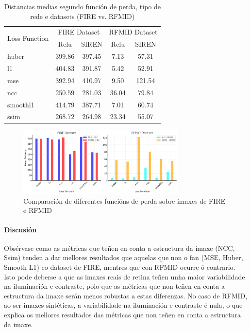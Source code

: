\begin{table}[h]
    \centering
    \begin{tabular}{|l|cc|cc|}
    \hline
    \multirow{2}{*}{Loss Function} & \multicolumn{2}{c|}{FIRE Dataset} & \multicolumn{2}{c|}{RFMID Dataset} \\ \cline{2-5}
     & Relu & SIREN & Relu & SIREN \\ \hline
    huber & 399.86 & 397.45 & 7.13 & 57.31 \\ \hline
    l1 & 404.83 & 391.87 & 5.42 & 52.91 \\ \hline
    mse & 392.94 & 410.97 & 9.50 & 121.54 \\ \hline
    ncc & 250.59 & 281.03 & 36.04 & 79.84 \\ \hline
    smoothl1 & 414.79 & 387.71 & 7.01 & 60.74 \\ \hline
    ssim & 268.72 & 264.98 & 23.34 & 55.07 \\ \hline
    \end{tabular}
    \caption{Distancias medias segundo función de perda, tipo de rede e datasets (FIRE vs. RFMID)}
    \label{tab:mean_distances}
\end{table}

\begin{figure}[h]
    \centering
    \includegraphics[width=0.75\textwidth]{imaxes/losstype.png}
    \caption{Comparación de diferentes funcións de perda sobre imaxes de FIRE e RFMID}
    \label{fig:loss_functions_comparison}
\end{figure}
    


\paragraph{Discusión}
\label{par:Discusión}

Obsérvase como as métricas que teñen en conta a estructura da imaxe (NCC, Ssim) tenden a dar mellores resultados que aquelas que non o fan (MSE, Huber, Smooth L1) co dataset de FIRE, mentres que con RFMID ocurre ó contrario.
Isto pode deberse a que as imaxes reais de retina teñen unha maior variabilidade na iluminación e contraste, polo que as métricas que non teñen en conta a estructura da imaxe serán menos robustas a estas diferenzas.
No caso de RFMID, ao ser imaxes sintéticas, a variabilidade na iluminación e contraste é nula, o que explica os mellores resultados das métricas que non teñen en conta a estructura da imaxe.

